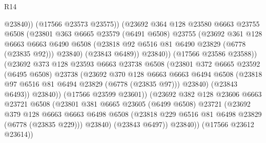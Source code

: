 \begin{lexlean}{R14}
\begin{coremodule}
                              @23840))
                          (@17566 @23573 @23575))
                        (@23692
                          @364
                          @128
                          @23580
                          @6663
                          @23755
                          @6508
                          (@23801
                            @363
                            @6665
                            @23579
                            (@6491 @6508)
                            @23755
                            (@23692
                              @361
                              @128
                              @6663
                              @6663
                              @6490
                              @6508
                              (@23818 @92 @6516 @81 @6490 @23829 (@6778 (@23835 @92)))
                              @23840)
                            (@23843 @6489))
                          @23840))
                      (@17566 @23586 @23588))
                    (@23692
                      @373
                      @128
                      @23593
                      @6663
                      @23738
                      @6508
                      (@23801
                        @372
                        @6665
                        @23592
                        (@6495 @6508)
                        @23738
                        (@23692
                          @370
                          @128
                          @6663
                          @6663
                          @6494
                          @6508
                          (@23818 @97 @6516 @81 @6494 @23829 (@6778 (@23835 @97)))
                          @23840)
                        (@23843 @6493))
                      @23840))
                  (@17566 @23599 @23601))
                (@23692
                  @382
                  @128
                  @23606
                  @6663
                  @23721
                  @6508
                  (@23801
                    @381
                    @6665
                    @23605
                    (@6499 @6508)
                    @23721
                    (@23692
                      @379
                      @128
                      @6663
                      @6663
                      @6498
                      @6508
                      (@23818 @229 @6516 @81 @6498 @23829 (@6778 (@23835 @229)))
                      @23840)
                    (@23843 @6497))
                  @23840))
              (@17566 @23612 @23614))

\end{coremodule}
\end{lexlean}
